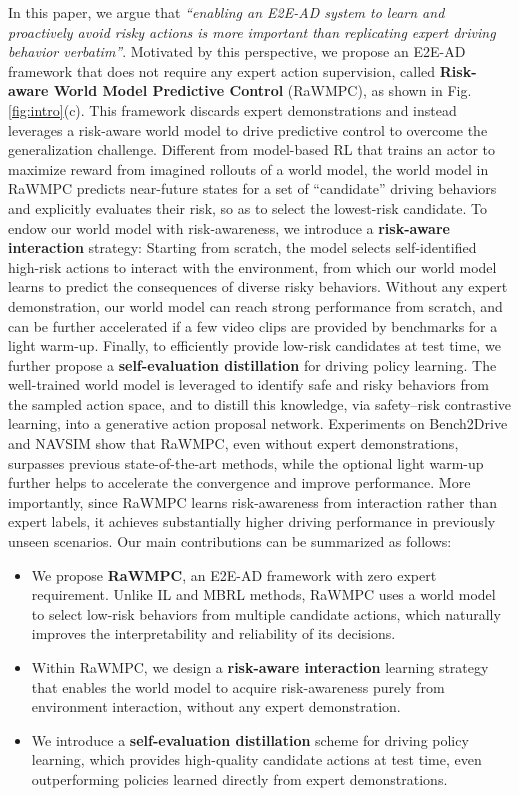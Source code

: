 \documentclass[twocolumn]{template}
\theoremstyle{thmstyleone}%
\theoremstyle{thmstyletwo}%
\theoremstyle{thmstylethree}%
\begin{document}
In this paper,
we argue that \emph{``enabling an E2E-AD system to learn and proactively avoid risky actions is more important than replicating expert driving behavior verbatim''}.
Motivated by this perspective,
we propose an E2E-AD framework that does not require any expert action supervision,
called \textbf{Risk-aware World Model Predictive Control} (RaWMPC), as shown in Fig. \ref{fig:intro}(c).
This framework discards expert demonstrations and instead leverages a risk-aware world model to drive predictive control to overcome the generalization challenge.
Different from model-based RL that trains an actor to maximize reward from imagined rollouts of a world model,
the world model in RaWMPC predicts near-future states for a set of ``candidate'' driving behaviors and explicitly evaluates their risk, so as to select the lowest-risk candidate.
To endow our world model with risk-awareness,
we introduce a \textbf{risk-aware interaction} strategy:
Starting from scratch, the model selects self-identified high-risk actions to interact with the environment,
from which our world model learns to predict the consequences of diverse risky behaviors.
Without any expert demonstration, our world model can reach strong performance from scratch,
and can be further accelerated if a few video clips are provided by benchmarks for a light warm-up.
Finally, to efficiently provide low-risk candidates at test time, we further propose a \textbf{self-evaluation distillation} for driving policy learning.
The well-trained world model is leveraged to identify safe and risky behaviors from the sampled action space, and to distill this knowledge, via safety–risk contrastive learning, into a generative action proposal network.
Experiments on Bench2Drive and NAVSIM show that RaWMPC, even without expert demonstrations, surpasses previous state-of-the-art methods, while the optional light warm-up further helps to accelerate the convergence and improve performance.
More importantly,
since RaWMPC learns risk-awareness from interaction rather than expert labels,
it achieves substantially higher driving performance in previously unseen scenarios.
Our main contributions can be summarized as follows:
\begin{itemize}
\item We propose \textbf{RaWMPC}, an E2E-AD framework with zero expert requirement.
Unlike IL and MBRL methods, RaWMPC uses a world model to select low-risk behaviors from multiple candidate actions, which naturally improves the interpretability and reliability of its decisions.
\item Within RaWMPC, we design a \textbf{risk-aware interaction} learning strategy that enables the world model to acquire risk-awareness purely from environment interaction, without any expert demonstration.
\item We introduce a \textbf{self-evaluation distillation} scheme for driving policy learning, which provides high-quality candidate actions at test time, even outperforming policies learned directly from expert demonstrations.
\end{itemize}
\end{document}
